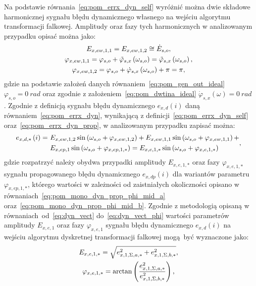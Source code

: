 Na podstawie równania~\eqref{eq:pom_errx_dyn_self} wyróżnić można dwie składowe harmonicznej sygnału błędu dynamicznego własnego na wejściu algorytmu transformacji falkowej. Amplitudy oraz fazy tych harmonicznych w analizowanym przypadku opisać można jako:
\begin{gather}
E_{x,ew,1,1} = E_{x,ew,1,2} \cong \dot{E}_{s,o} \label{eq:pom_mono_dyn_self_amp_mid}, \\
\varphi_{x,ew,1,1} = \varphi_{s,o} + \tilde{\varphi}_{s,x} \left(\omega_{s,o}\right) = \tilde{\varphi}_{s,x} \left(\omega_{s,o}\right) \label{eq:pom_mono_dyn_self_phi_mid_1}, \\
\varphi_{x,ew,1,2} = \varphi_{s,o} + \dot{\varphi}_{s,x} \left(\omega_{s,o}\right) + \pi = \pi \label{eq:pom_mono_dyn_self_phi_mid_2},
\end{gather}
gdzie na podstawie założeń danych równaniem~\eqref{eq:pom_gen_out_ideal} $\varphi_{s,o} = \qty{0}{rad}$ oraz zgodnie z założeniem~\eqref{eq:pom_dwtina_ideal} $\dot{\varphi}_{s,x}(\omega) = \qty{0}{rad}$. Zgodnie z definicją sygnału błędu dynamicznego $e_{x,d}(i)$ daną równaniem~\eqref{eq:pom_errx_dyn}, wynikającą z definicji~\eqref{eq:pom_errx_dyn_self} oraz~\eqref{eq:pom_errx_dyn_prop}, w analizowanym przypadku zapisać można:
\begin{equation}
\begin{split}
e_{x,d,*} \left(i\right) =~
& E_{x,ew,1,2} \sin \left(\omega_{s,o} + \varphi_{x,ew,1,2}\right) + E_{x,ew,1,1} \sin \left(\omega_{s,o} + \varphi_{x,ew,1,1}\right) + \\
& E_{x,ep,1} \sin \left(\omega_{s,o} + \varphi_{x,ep,1,*}\right) = E_{x,e,1,*} \sin \left(\omega_{s,o} + \varphi_{x,e,1,*}\right)
\end{split}
\label{eq:pom_mono_dyn_sum_err_mid},
\end{equation}
gdzie rozpatrzyć należy obydwa przypadki amplitudy $E_{x,e,1,*}$ oraz fazy $\varphi_{x,e,1,*}$ sygnału propagowanego błędu dynamicznego $e_{x,dp}(i)$ dla wariantów parametru $\varphi_{x,ep,1,*}$, którego wartości w zależności od zaistniałych okoliczności opisano w równaniach~\eqref{eq:pom_mono_dyn_prop_phi_mid_a} oraz~\eqref{eq:pom_mono_dyn_prop_phi_mid_b}. Zgodnie z metodologią opisaną w równaniach~od~\eqref{eq:dyn_vect} do~\eqref{eq:dyn_vect_phi} wartości parametrów amplitudy $E_{x,e,1}$ oraz fazy $\varphi_{x,e,1}$ sygnału błędu dynamicznego $e_{x,d}(i)$ na wejściu algorytmu dyskretnej transformacji falkowej mogą być wyznaczone jako:
\begin{gather}
E_{x,e,1,*} = \sqrt{e_{x,1,\Sigma,a,*}^{2} + e_{x,1,\Sigma,b,*}^{2}} \label{eq:pom_mono_dyn_sum_param_amp_mid}, \\
\varphi_{x,e,1,*} = \arctan \left(\frac{e_{x,1,\Sigma,a,*}^{2}}{e_{x,1,\Sigma,b,*}^{2}}\right) \label{eq:pom_mono_dyn_sum_param_phi_mid},
\end{gather}
